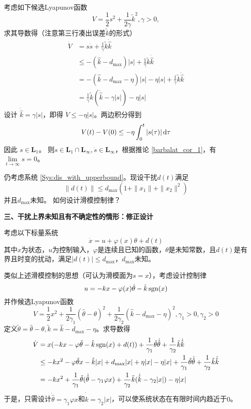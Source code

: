   考虑如下候选Lyapunov函数
  \[ V = \frac{1}{2} s^2 + \frac{1}{2 \gamma} \tilde{k}^2, \gamma > 0, \]
  求其导数得（注意第三行凑出误差$\tilde{k}$的形式）
  \begin{align*}
    \dot{V} & = s  \dot{s} + \frac{1}{\gamma} \tilde{k} \dot{\hat{k}}\\
    & \leq - (\hat{k} - d_{\max}) | s | + \frac{1}{\gamma} \tilde{k}
    \dot{\hat{k}}\\
    & = - (\hat{k} - d_{\max} - \eta) | s | - \eta | s | + \frac{1}{\gamma}
    \tilde{k} \dot{\hat{k}}\\
    & = \frac{1}{\gamma} \tilde{k} (\dot{\hat{k}} - \gamma | s |) - \eta | s |
  \end{align*}
  设计 $\dot{\hat{k}} = \gamma | s |$，即得 $\dot{V} \leq - \eta | s |$。两边积分得到
  \[ V (t) - V (0) \leq - \eta \int^t_0 | s(\tau) | \mathop{}\!\mathrm{d} \tau \]
  因此 $s \in \mathbf{L}_1$。
  则$s \in \mathbf{L}_1 \cap \mathbf{L}_{\infty}, \dot{s} \in
  \mathbf{L}_{\infty}$，根据推论 \ref{barbalat_cor_1}，有 $\lim\limits_{t \rightarrow \infty} s = 0$。
\begin{problem}\label{Pro:dis_with_unknown_upperbound}
    仍考虑系统 \eqref{Sys:dis_with_upperbound}。现设干扰$d(t)$满足
  \[ \| d (t) \| \leq d_{\max} (1 + \| x_1 \| + \| x_2 \|^2) \]
并且$d_{\max}$未知。
如何设计滑模控制律？
\end{problem}

\noindent\textbf{三、干扰上界未知且有不确定性的情形：修正设计}

考虑以下标量系统
\begin{equation}
    \dot{x} = u + \varphi(x)\theta + d(t)
\end{equation}
其中$x$为状态，$u$为控制输入，$\varphi$是连续且已知的函数，$\theta$是未知常数，且$d(t)$是有界且时变的扰动，满足$|d(t)|\le d_{\max}$，$d_{\max}$未知。

类似上述滑模控制的思想（可认为滑模面为$s=x$），考虑设计控制律\[u=-kx-\varphi(x)\hat{\theta}-\hat{k}\operatorname{sgn}(x)\]
并作候选Lyapunov函数\[V=\frac{1}{2}x^2+\frac{1}{2\gamma_1}(\hat{\theta}-\theta)^2+\frac{1}{2\gamma_2}(\hat{k}-d_{\max}-\eta)^2,\gamma_1>0,\gamma_2>0\]
定义$\tilde{\theta}=\hat{\theta}-\theta,\tilde{k}=\hat{k}-d_{\max}-\eta$。求导数得
\begin{align*}
    \dot{V}&=x(-kx-\varphi\tilde{\theta}-\hat{k}\operatorname{sgn}(x)+d(t))+\frac{1}{\gamma_1}\tilde{\theta}\dot{\hat{\theta}}+\frac{1}{\gamma_2}\tilde{k}\dot{\hat{k}}\\
    &\leq -kx^2-\varphi\tilde{\theta}x-\hat{k}|x|+d_{\max}|x|+\eta|x|-\eta|x|+\frac{1}{\gamma_1}\tilde{\theta}\dot{\hat{\theta}}+\frac{1}{\gamma_2}\tilde{k}\dot{\hat{k}}\\
    &=-kx^2+\frac{1}{\gamma_1}\tilde{\theta}(\dot{\hat{\theta}}-\gamma_1\varphi x)+\frac{1}{\gamma_2}\tilde{k}(\dot{\hat{k}}-\gamma_2|x|)-\eta|x|
\end{align*}
于是，只需设计$\dot{\hat{\theta}}=\gamma_1\varphi x$和$\dot{\hat{k}}=\gamma_2|x|$，可以使系统状态在有限时间内趋近于$0$。

